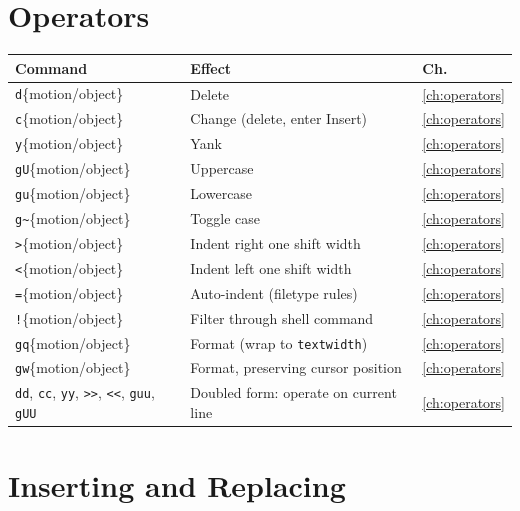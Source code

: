 \section{Operators}

\begin{longtable}{@{}l p{9cm} l@{}}
\textbf{Command} & \textbf{Effect} & \textbf{Ch.} \\
\hline
\endhead
\texttt{d}\{motion/object\} & Delete & \ref{ch:operators} \\
\texttt{c}\{motion/object\} & Change (delete, enter Insert) & \ref{ch:operators} \\
\texttt{y}\{motion/object\} & Yank & \ref{ch:operators} \\
\texttt{gU}\{motion/object\} & Uppercase & \ref{ch:operators} \\
\texttt{gu}\{motion/object\} & Lowercase & \ref{ch:operators} \\
\texttt{g\textasciitilde}\{motion/object\} & Toggle case & \ref{ch:operators} \\
\texttt{>}\{motion/object\} & Indent right one shift width & \ref{ch:operators} \\
\texttt{<}\{motion/object\} & Indent left one shift width & \ref{ch:operators} \\
\texttt{=}\{motion/object\} & Auto-indent (filetype rules) & \ref{ch:operators} \\
\texttt{!}\{motion/object\} & Filter through shell command & \ref{ch:operators} \\
\texttt{gq}\{motion/object\} & Format (wrap to \texttt{textwidth}) & \ref{ch:operators} \\
\texttt{gw}\{motion/object\} & Format, preserving cursor position & \ref{ch:operators} \\
\texttt{dd}, \texttt{cc}, \texttt{yy}, \texttt{>>}, \texttt{<<}, \texttt{guu}, \texttt{gUU} & Doubled form: operate on current line & \ref{ch:operators} \\
\end{longtable}

\section{Inserting and Replacing}

